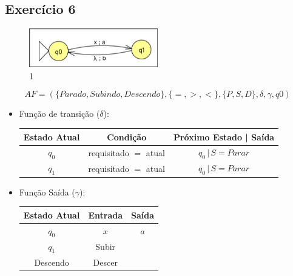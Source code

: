     \subsection{Exercício 6}
        \begin{figure}[H]
            \centering
            \includegraphics[width=0.5\textwidth]{images/Aula07/2.png}
            \caption*{1}
        \end{figure}

        \[AF = (\{Parado, Subindo, Descendo\}, \{=, >, <\}, \{P, S, D\}, \delta, \gamma, q0)\]
        
        \begin{itemize}
            \item Função de transição ($\delta$):
                \begin{center}
                    \begin{tabular}{|c|c|c|}
                        \hline
                        Estado Atual & Condição & Próximo Estado | Saída \\
                        \hline
                        $q_0$ & requisitado $=$ atual & $q_0 \,|\, S = Parar$ \\
                        \hline
                        $q_1$ & requisitado $=$ atual & $q_0 \,|\, S = Parar$ \\
                        \hline  
                    \end{tabular}
                \end{center}
                
            \item Função Saída ($\gamma$):
            \begin{center}
                \begin{tabular}{|c|c|c|}
                    \hline
                    Estado Atual & Entrada & Saída\\
                    \hline
                    $q_0$ & $x$ & $a$\\
                    \hline
                    $q_1$ & Subir\\
                    \hline
                    Descendo & Descer\\
                    \hline
                \end{tabular}
            \end{center}
        \end{itemize}


